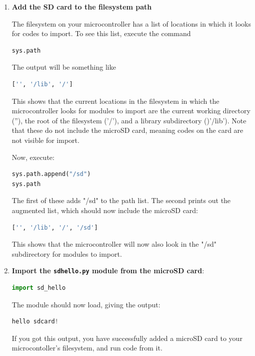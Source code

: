 \begin{enumerate}
	\item \textbf{Add the SD card to the filesystem path}

	The filesystem on your microcontroller has a list of locations in which it looks for codes to import.
	To see this list, execute the command
\begin{lstlisting}[language=Python]
sys.path
\end{lstlisting}
 The output will be something like
\begin{lstlisting}[language=Python]
['', '/lib', '/']
\end{lstlisting}
 This shows that the current locations in the filesystem in which the microcontroller looks for modules to import are the current working directory (''), the root of the filesystem ('/'), and a library subdirectory ()'/lib').
 Note that these do not include the microSD card, meaning codes on the card are not visible for import.

 \smallskip
 Now, execute:
 \begin{lstlisting}[language=Python]
sys.path.append("/sd")
sys.path
\end{lstlisting}
 The first of these adds "/sd" to the path list.
 The second prints out the augmented list, which should now include the microSD card:
\begin{lstlisting}[language=Python]
['', '/lib', '/', '/sd']
\end{lstlisting}
This shows that the microcontroller will now also look in the "/sd" subdirectory for modules to import.

	\item \textbf{Import the \texttt{sd\textunderscore hello.py} module from the microSD card}:
\begin{lstlisting}[language=Python]
import sd_hello
\end{lstlisting}
 The module should now load, giving the output:
\begin{lstlisting}[language=Python]
hello sdcard!
\end{lstlisting}

 If you got this output, you have successfully added a microSD card to your microcontoller's filesystem, and run code from it.
\end{enumerate}



%
%
%
